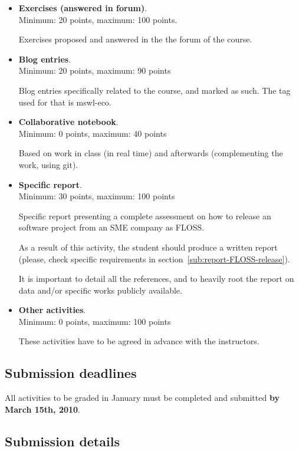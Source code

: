 \documentclass[a4paper]{article}
\begin{document}
\begin{itemize}
\item \textbf{Exercises (answered in forum)}. \\
  Minimum: 20 points, maximum: 100 points.

  Exercises proposed and answered in the the forum of the course.

\item \textbf{Blog entries}. \\
  Minimum: 20 points, maximum: 90 points

  Blog entries specifically related to the course, and marked as such. The tag used for that is mswl-eco.

\item \textbf{Collaborative notebook}. \\
  Minimum: 0 points, maximum: 40 points

  Based on work in class (in real time) and afterwards (complementing the work, using git).

\item \textbf{Specific report}. \\
  Minimum: 30 points, maximum: 100 points

Specific report presenting a complete assessment on how to release an software project from an SME company as FLOSS.

As a result of this activity, the student should produce a written report (please, check specific requirements in section~\ref{sub:report-FLOSS-release}).

It is important to detail all the references, and to heavily root the report on data and/or specific works publicly available.

\item \textbf{Other activities}. \\
  Minimum: 0 points, maximum: 100 points

  These activities have to be agreed in advance with the instructors.
\end{itemize}

\subsection{Submission deadlines}

All activities to be graded in January must be completed and submitted \textbf{by March 15th, 2010}.

\subsection{Submission details}
\end{document}
